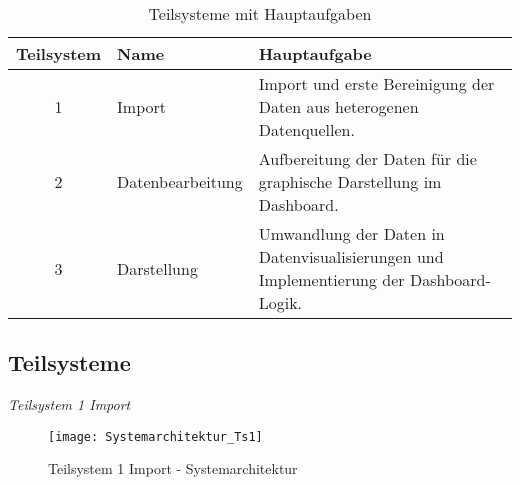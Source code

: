        \begingroup
            \setlength{\tabcolsep}{4pt} %
            \renewcommand{\arraystretch}{1.5}
            \begin{table}[H]
                \centering
                \begin{adjustbox}{max width=\textwidth}
                \LARGE
                \begin{tabular}{cll}
                   \toprule
                   \textbf{Teilsystem}             & Name   &{Hauptaufgabe} \\
                   \midrule     
                            1                      &Import  &Import und erste Bereinigung der Daten aus heterogenen Datenquellen.\\
                            2                      &Datenbearbeitung     &Aufbereitung der Daten für die graphische Darstellung im Dashboard.\\
                            3                      &Darstellung          &Umwandlung der Daten in Datenvisualisierungen und Implementierung der Dashboard-Logik.\\

                    \bottomrule
                \end{tabular}
                \end{adjustbox}
                \caption{%
                    Teilsysteme mit Hauptaufgaben
                \label{tab:Teilsysteme}
                }
                 \end{table}
            \endgroup

    \clearpage
    \subsection{Teilsysteme}
    \label{chap:five_one_three}
    
    \noindent
    \textit{Teilsystem 1 Import}\\
    \begin{figure}[H]
        \centering
            \texttt{[image: Systemarchitektur\_Ts1]}
            \caption{Teilsystem 1 Import - Systemarchitektur}
            \label{fig:Systemarchitektur Teilsystem 1}
    \end{figure}


